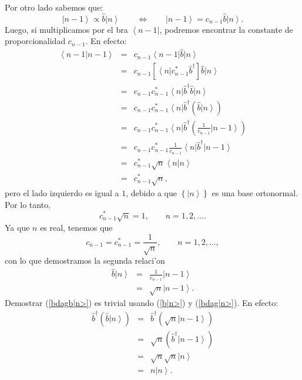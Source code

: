 Por otro lado sabemos que:%
\begin{equation}
\left| n-1\right> \propto\hat{b}\left| n\right>
\qquad\Leftrightarrow\qquad\left| n-1\right> =c_{n-1}\hat{b}\left|
n\right> .
\end{equation}
Luego, si multiplicamos por el bra $\left\langle n-1\right| $, podremos
encontrar la constante de proporcionalidad $c_{n-1}.$ En efecto:
\begin{eqnarray}
\left\langle n-1\right| \left. n-1\right> & = &c_{n-1}\left\langle
n-1\right| \hat{b}\left| n\right> \\
& = &c_{n-1}\left[ \left\langle n\right| c_{n-1}^{\ast}\hat{b}^{\dag
}\right] \hat{b}\left| n\right> \\
& = &c_{n-1}c_{n-1}^{\ast}\left\langle n\right| \hat{b}^{\dag}\hat
{b}\left| n\right> \\
& = &c_{n-1}c_{n-1}^{\ast}\left\langle n\right| \hat{b}^{\dag}\left(
\hat{b}\left| n\right> \right) \\
& = &c_{n-1}c_{n-1}^{\ast}\left\langle n\right| \hat{b}^{\dag}\left(
\frac{1}{c_{n-1}}\left| n-1\right> \right) \\
& = &c_{n-1}c_{n-1}^{\ast}\frac{1}{c_{n-1}}\left\langle n\right| \hat
{b}^{\dag}\left| n-1\right> \\
& = &c_{n-1}^{\ast}\sqrt{n}\left\langle n\right| \left. n\right> \\
& = &c_{n-1}^{\ast}\sqrt{n} ,
\end{eqnarray}
pero el lado izquierdo es igual a $1$, debido a que $\left\{ \left| n\right>
\right\} $ es una base ortonormal. Por lo tanto,
\begin{equation}
c_{n-1}^{\ast}\sqrt{n}  =1, \qquad n=1,2,\dots .
\end{equation}
Ya que $n$ es real, tenemos que
\begin{equation}
c_{n-1}=c_{n-1}^{\ast}=\frac{1}{\sqrt{n}}, \qquad n=1,2,\dots ,
\end{equation}
con lo que demostramos la segunda relaci'on%
\begin{eqnarray}
\hat{b}\left| n\right> & = &\frac{1}{c_{n-1}}\left|
n-1\right> \\
& = &\sqrt{n}\left| n-1\right> .
\end{eqnarray}
Demostrar (\ref{bdagb|n>}) es trivial usando (\ref{b|n>}) y (\ref{bdag|n>}).
En efecto:
\begin{eqnarray}
\hat{b}^{\dag}\left( \hat{b}\left| n\right> \right) & = &\hat
{b}^{\dag}\left( \sqrt{n}\left| n-1\right> \right) \\
& = &\sqrt{n}\left( \hat{b}^{\dag}\left| n-1\right> \right) \\
& = &\sqrt{n}\sqrt{n}\left| n\right> \\
& = &n\left| n\right> .
\end{eqnarray}


